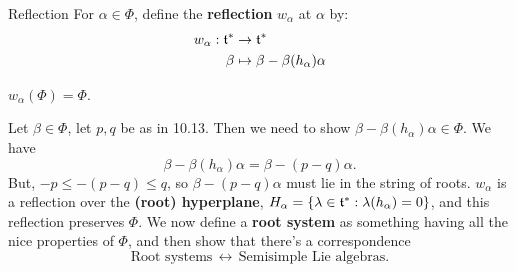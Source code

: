 \documentclass{article}
\begin{document}
\endproof
\begin{fancydefine}{Reflection}
    For $\alpha \in \Phi$, define the \textbf{reflection} $w_{\alpha}$ at $\alpha$ by: \begin{align*}
        w_{\alpha} : \mathfrak{t}^{*} &\to \mathfrak{t}^{*}\\
        \beta &\mapsto \beta - \beta(h_{\alpha})\alpha
    \end{align*}
\end{fancydefine}
\begin{corr}{}
    $w_{\alpha}(\Phi) = \Phi$.
\end{corr}
\proof Let $\beta \in \Phi$, let $p,q$ be as in 10.13. Then we need to show $\beta - \beta(h_{\alpha})\alpha \in \Phi$. We have \[ \beta - \beta(h_{\alpha})\alpha = \beta - (p-q)\alpha.\]
But, $-p \leq -(p-q) \leq q$, so $\beta - (p-q)\alpha$ must lie in the string of roots. \endproof
$w_{\alpha}$ is a reflection over the \textbf{(root) hyperplane}, $H_{\alpha} = \{ \lambda \in \mathfrak{t}^{*} : \lambda(h_{\alpha})=0 \}$, and this reflection preserves $\Phi$. We now define a \textbf{root system} as something having all the nice properties of $\Phi$, and then show that there's a correspondence \[ \text{Root systems} \, \leftrightarrow \, \text{Semisimple Lie algebras}.\]
\end{document}

